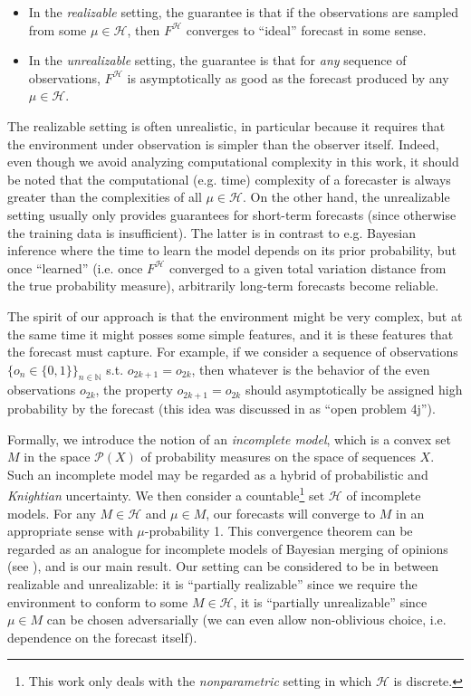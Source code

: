 \documentclass[11pt]{article}
\theoremstyle{definition}
\theoremstyle{plain}
\newcommand{\Nats}{\mathbb{N}}
\newcommand{\PM}{\mathcal{P}}
\newcommand{\MC}{\mathcal{H}}
\begin{document}
\begin{itemize}
\item 
In the \emph{realizable} setting, the guarantee is that if the observations are sampled from some $\mu \in \MC$, then $F^\MC$ converges to \enquote{ideal} forecast in some sense.
\item
In the \emph{unrealizable} setting, the guarantee is that for \emph{any} sequence of observations, $F^\MC$ is asymptotically as good as the forecast produced by any $\mu \in \MC$.
\end{itemize}

The realizable setting is often unrealistic, in particular because it requires that the environment under observation is simpler than the observer itself. Indeed, even though we avoid analyzing computational complexity in this work, it should be noted that the computational (e.g. time) complexity of a forecaster is always greater than the complexities of all $\mu \in \MC$. On the other hand, the unrealizable setting usually only provides guarantees for short-term forecasts (since otherwise the training data is insufficient). The latter is in contrast to e.g. Bayesian inference where the time to learn the model depends on its prior probability, but once \enquote{learned} (i.e. once $F^\MC$ converged to a given total variation distance from the true probability measure), arbitrarily long-term forecasts become reliable.

The spirit of our approach is that the environment might be very complex, but at the same time it might posses some simple features, and it is these features that the forecast must capture. For example, if we consider a sequence of observations $\{o_n \in \{0,1\}\}_{n \in \Nats}$ s.t. $o_{2k+1}=o_{2k}$, then whatever is the behavior of the even observations $o_{2k}$, the property $o_{2k+1}=o_{2k}$ should asymptotically be assigned high probability by the forecast (this idea was discussed in \cite{Hutter_2009} as \enquote{open problem 4j}).

Formally, we introduce the notion of an \emph{incomplete model}, which is a convex set $M$ in the space $\PM(X)$ of probability measures on the space of sequences $X$. Such an incomplete model may be regarded as a hybrid of probabilistic and \emph{Knightian} uncertainty. We then consider a countable\footnote{This work only deals with the \emph{nonparametric} setting in which $\MC$ is discrete.} set $\MC$ of incomplete models. For any $M \in \MC$ and $\mu \in M$, our forecasts will converge to $M$ in an appropriate sense with $\mu$-probability 1. This convergence theorem can be regarded as an analogue for incomplete models of Bayesian merging of opinions (see \cite{Blackwell_1962}), and is our main result. Our setting can be considered to be in between realizable and unrealizable: it is \enquote{partially realizable} since we require the environment to conform to some $M \in \MC$, it is \enquote{partially unrealizable} since $\mu \in M$ can be chosen adversarially (we can even allow non-oblivious choice, i.e. dependence on the forecast itself).
\end{document}
